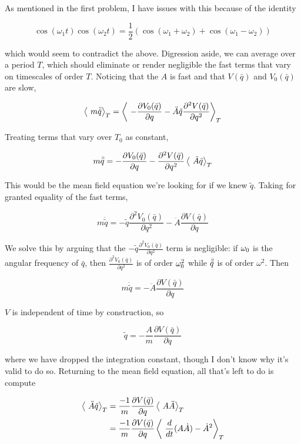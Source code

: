 \documentclass[12pt]{article}
\begin{document}
As mentioned in the first problem, I have issues with this because of the identity

\[ \cos(\omega_1 t)\cos(\omega_2 t) = \frac{1}{2}(\cos(\omega_1 + \omega_2) + \cos(\omega_1 - \omega_2))
\]

which would seem to contradict the above. Digression aside, we can average over a period \(T\), which should eliminate or render negligible the fast terms that vary on timescales of order \(T\). Noticing that the \(A\) is fast and that \(V(\bar{q})\) and \(V_0(\bar{q})\) are slow,

\[ \left\langle\ m\ddot{\bar{q}} \right\rangle_T = \left\langle\ -\frac{\partial V_0(\bar{q})}{\partial q} - \ddot{A}\tilde{q}\frac{\partial^2 V(\bar{q})}{\partial q^2}  \right\rangle_T
\]

Treating terms that vary over \(T_0\) as constant,

\[m\ddot{\bar{q}} = -\frac{\partial V_0(\bar{q})}{\partial q} - \frac{\partial^2 V(\bar{q})}{\partial q^2}\left\langle\ \ddot{A}\tilde{q} \right\rangle_T
\]

This would be the mean field equation we're looking for if we knew \(\tilde{q}\). Taking for granted equality of the fast terms,

\[m\ddot{\tilde{q}} = - \tilde{q}\frac{\partial^2 V_0(\bar{q})}{\partial q ^2} - \ddot{A}\frac{\partial V(\bar{q})}{\partial q}
\]

We solve this by arguing that the \( - \tilde{q}\frac{\partial^2 V_0(\bar{q})}{\partial q ^2} \) term is negligible: if \(\omega_0\) is the angular frequency of \(\bar{q}\), then \(\frac{\partial^2 V_0(\bar{q})}{\partial q ^2} \) is of order \(\omega_0^2\) while \( \ddot{\tilde{q}} \) is of order \(\omega^2\). Then

\[ m\ddot{\tilde{q}} = - \ddot{A}\frac{\partial V(\bar{q})}{\partial q}
\]

\(V\) is independent of time by construction, so

\[ \tilde{q} = -\frac{A}{m}\frac{\partial V(\bar{q})}{\partial q}
\] 

where we have dropped the integration constant, though I don't know why it's valid to do so. Returning to the mean field equation, all that's left to do is compute

\begin{align*}
\left\langle\ \ddot{A}\tilde{q} \right\rangle_T &= \frac{-1}{m}\frac{\partial V(\bar{q})}{\partial q}\left\langle\ A\ddot{A} \right\rangle_T \\
&= \frac{-1}{m}\frac{\partial V(\bar{q})}{\partial q}\left\langle\  \frac{d}{dt}(A \dot{A}) - \dot{A}^2   \right\rangle_T
\end{align*} 
\end{document}
